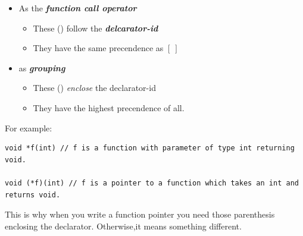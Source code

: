 \documentclass{report}
\begin{document}
\begin{itemize}
    \item As the \textit{\textbf{function call operator}}
        \begin{itemize}[label=$\circ$]
            \item These () follow the \textit{\textbf{delcarator-id}}
            \item They have the same precendence as $[ \ ]$
        \end{itemize}
    \item as \textit{\textbf{grouping}}
        \begin{itemize}[label=$\circ$]
            \item These () \textit{enclose} the declarator-id
            \item They have the highest precendence of all.
        \end{itemize}
\end{itemize}
\noindent For example:
\begin{verbatim}
void *f(int) // f is a function with parameter of type int returning void.

void (*f)(int) // f is a pointer to a function which takes an int and returns void.
\end{verbatim}
This is why when you write a function pointer you need those parenthesis enclosing the declarator. Otherwise,it means something different.
\end{document}
